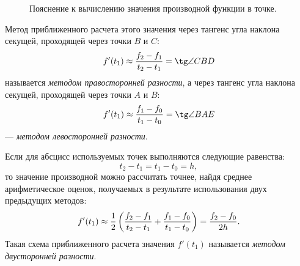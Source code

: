 \documentclass[12pt,a4paper,openany]{extarticle}
\begin{document}
\begin{figure}[h!]
	\caption{Пояснение к вычислению значения производной функции в точке.}
	\label{fig:derivative_calc}
\end{figure}


Метод приближенного расчета этого значения через тангенс угла наклона секущей, проходящей через точки $B$ и $C$:
\begin{equation}
f'(t_1) \approx \dfrac{f_2-f_1}{t_2-t_1} = \tg\angle CBD
\end{equation}
называется \textit{методом правосторонней разности}, а через тангенс угла наклона секущей, проходящей через точки $A$ и $B$:
\begin{equation}
f'(t_1) \approx \dfrac{f_1-f_0}{t_1-t_0} = \tg\angle BAE
\end{equation}
--- 	\textit{методом левосторонней разности}.

Если для абсцисс используемых точек выполняются следующие равенства:
\begin{equation}
t_2 - t_1 = t_1 - t_0 = h,
\end{equation}
то значение производной можно рассчитать точнее, найдя среднее арифметическое оценок, получаемых в результате использования двух предыдущих методов:
\begin{equation}
f'(t_1) \approx \frac{1}{2}\left(\dfrac{f_2-f_1}{t_2-t_1} + \dfrac{f_1-f_0}{t_1-t_0}\right) = \dfrac{f_2-f_0}{2h}\ldotp
\end{equation}
Такая схема приближенного расчета значения $f'(t_1)$ называется \textit{методом двусторонней разности}.
\end{document}
